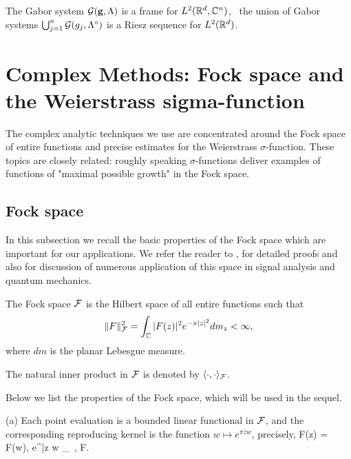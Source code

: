 \documentclass[12pt]{amsart}
\begin{document}
 

\begin{thm} \label{ron-shen}
  The Gabor system $\mathcal{G} (\mathbf{g}, \Lambda )$ is a frame for 
  $L^2(\mathbb{R}^d, \mathbb{C}^n)$,
  \fif\ the union of Gabor systems $\bigcup _{j=1}^n \mathcal{G} (g_j, \Lambda
  ^\circ )$  is a Riesz sequence for $L^2(\mathbb{R} ^d ) $. 
\end{thm}





 
 \section{Complex Methods:  Fock space and the Weierstrass
   sigma-function} 



The complex analytic techniques  we use   are concentrated around
 the Fock space   of  entire functions and precise estimates for
 the Weierstrass 
$\sigma$-function. These topics are closely related: roughly speaking   
$\sigma$-functions deliver examples of functions of "maximal possible growth" 
in  the Fock space.

\subsection{Fock space}
  
In this subsection we recall the basic properties of the Fock space
which are important for our applications. We  refer the reader to \cite{Folland}, 
\cite{Charlybook} for detailed proofs and also for discussion of numerous application
of this space in signal analysis and quantum mechanics.
 
 \begin{defin}
 \label{Fock}
 The Fock space $\mathcal{F}$ is the Hilbert space of all entire functions such that
 \begin{equation}
 \label{Fock_definition}
 \|F\|^2_{\mathcal{F}}=\int_ {\mathbb{C}} |F(z)|^2 e^{-\pi |z|^2} dm_z <\infty,
 \end{equation}
 where $dm$ is the planar Lebesgue measure.
\end{defin}
The natural inner product in $\mathcal{F}$ is  denoted by  $\langle \cdot,\cdot \rangle_{\mathcal{F}}$.

Below we list the properties of the Fock space, which will be used in the sequel. 

(a)  Each  point evaluation is a bounded linear functional in $\mathcal{F}$, 
 and  the  corresponding reproducing kernel is the function $w\mapsto
 e^{\pi \bar{z} w }$, precisely, 
\beq
\label{reproducing} 
F(z) = \lng F(w), e^{\pi \bar{z} w } \rng_\cF \, ,  \qquad  \forall  F\in \cF.
\eeq
\end{document}
